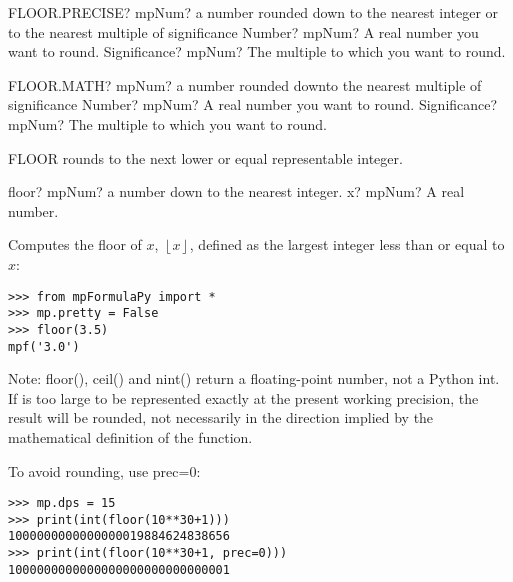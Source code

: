 \vspace{0.6cm}
\begin{mpFunctionsExtract}
	\mpWorksheetFunctionTwoNotImplemented
	{FLOOR.PRECISE? mpNum? a number rounded down to the nearest integer or to the nearest multiple of significance}
	{Number? mpNum? A real number you want to round.}
	{Significance? mpNum? The multiple to which you want to round.}
\end{mpFunctionsExtract}


\vspace{0.6cm}
\begin{mpFunctionsExtract}
	\mpWorksheetFunctionTwoNotImplemented
	{FLOOR.MATH? mpNum? a number rounded downto the nearest multiple of significance}
	{Number? mpNum? A real number you want to round.}
	{Significance? mpNum? The multiple to which you want to round.}
\end{mpFunctionsExtract}

\vspace{0.3cm}

FLOOR rounds to the next lower or equal representable integer.



\begin{mpFunctionsExtract}
	\mpFunctionOne
	{floor? mpNum?  a number down to the nearest integer.}
	{x? mpNum? A real number.}
\end{mpFunctionsExtract}


\vpara
Computes the floor of $x$, $\left\lfloor x \right\rfloor$, defined as the largest integer less than or equal to $x$:

\begin{lstlisting}
>>> from mpFormulaPy import *
>>> mp.pretty = False
>>> floor(3.5)
mpf('3.0')
\end{lstlisting}


Note: floor(), ceil() and nint() return a floating-point number, not a Python int. If is too large to be represented exactly at the present working precision, the result will be rounded, not necessarily in the direction implied by the mathematical definition of the function.

To avoid rounding, use prec=0:

\begin{lstlisting}
>>> mp.dps = 15
>>> print(int(floor(10**30+1)))
1000000000000000019884624838656
>>> print(int(floor(10**30+1, prec=0)))
1000000000000000000000000000001
\end{lstlisting}


